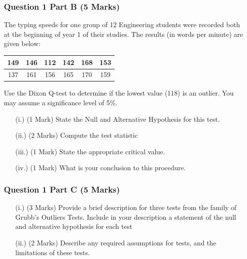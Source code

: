 \documentclass[a4paper,12pt]{article}
\begin{document}
	\subsubsection*{Question 1 Part B (5 Marks)}
	
	The typing speeds for one group of 12 Engineering students were recorded both at the beginning of year 1 of their studies. The results (in words per minute) are given below:
	
	\begin{center}
		\begin{tabular}{|c|c|c|c|c|c|}
			\hline
			149  & 146 & 112 & 142 & 168& 153\\ \hline
			137 & 161 & 156& 165&  170&  159
			\\ \hline
		\end{tabular}
	\end{center}
	Use the Dixon Q-test to determine if the lowest value (118) is an outlier. You may assume a significance level of 5\%.
	\begin{itemize}
		\item[(i.)](1 Mark)	State the Null and Alternative Hypothesis for this test.
		\item[(ii.)](2 Marks) Compute the test statistic
		\item[(iii.)](1 Mark) State the appropriate critical value.
		\item[(iv.)](1 Mark) What is your conclusion to this procedure.
	\end{itemize}
	\newpage
	\subsubsection*{Question 1 Part C (5 Marks)}
	
	\begin{itemize}
		\item[(i.)] (3 Marks) Provide a brief description for three tests from the family of Grubb's  Outliers Tests. Include in your description a statement of the null and alternative hypothesis for each test
		\item[(ii.)] (2 Marks) Describe any required assumptions for tests, and the limitations of these tests.
	\end{itemize}
	
\end{document}
